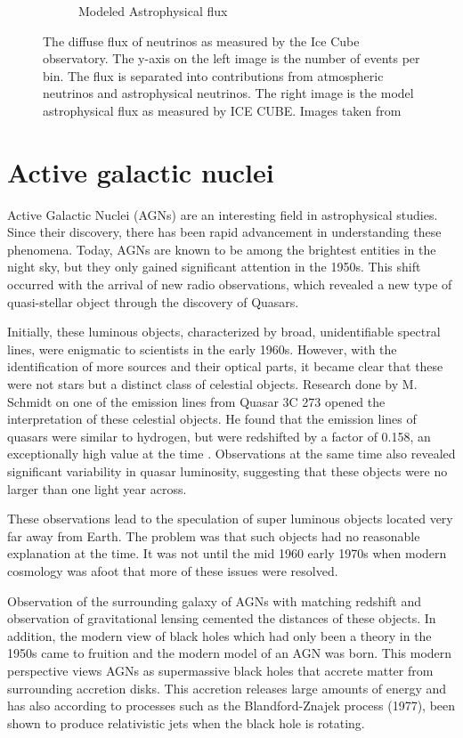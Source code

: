 \documentclass{article}
\begin{document}
\begin{figure}
\begin{subfigure}[b]{0.5\textwidth}
        \caption{Modeled Astrophysical flux}
    \end{subfigure}
    \caption{The diffuse flux of neutrinos as measured by the Ice Cube observatory. The y-axis on the left image is the number of events per bin.  The flux is separated into contributions from atmospheric neutrinos and astrophysical neutrinos. The right image is the model astrophysical flux as measured by ICE CUBE. Images taken from \cite{Abbasi_2022} }
    \label{fig:flux_neutrinos}
\end{figure}






\section{Active galactic nuclei}




Active Galactic Nuclei (AGNs) are an interesting field in astrophysical studies. 
Since their discovery, there has been rapid advancement in understanding these phenomena.
Today, AGNs are known to be among the brightest entities in the night sky,
but they only gained significant attention in the 1950s. 
This shift occurred with the arrival of new radio observations, which revealed a new type of quasi-stellar
object through the discovery of Quasars.

Initially, these luminous objects, characterized by broad, 
unidentifiable spectral lines, were enigmatic to scientists in the early 1960s. 
However, with the identification of more sources and their optical parts, 
it became clear that these were not stars but a distinct class of celestial objects. 
Research done by M. Schmidt on one of the emission lines from 
Quasar 3C 273 opened the interpretation of these celestial objects. 
He found that the emission lines of quasars were similar to hydrogen, but were redshifted by a factor of 0.158,
an exceptionally high value at the time \cite{Shields_1999}. Observations at the same time also revealed significant 
variability in quasar luminosity, suggesting that these objects were no larger than one light year across. 

These observations lead to the speculation of super luminous objects located very far away from Earth. The problem was that such objects
had no reasonable explanation at the time. It was not until the mid 1960 early 1970s when modern cosmology was 
afoot that more of these issues were resolved.

Observation of the surrounding galaxy of AGNs with matching redshift and observation of gravitational lensing cemented 
the distances of these objects. In addition, the modern view of black holes which had only been a theory in the 1950s came to
fruition and the modern model of an AGN was born. This modern perspective views AGNs as supermassive black holes that
accrete matter from surrounding accretion disks. This accretion releases large amounts of energy and has also according to 
processes such as the Blandford-Znajek process (1977), been shown to produce relativistic jets when the black hole is rotating.
\end{document}
